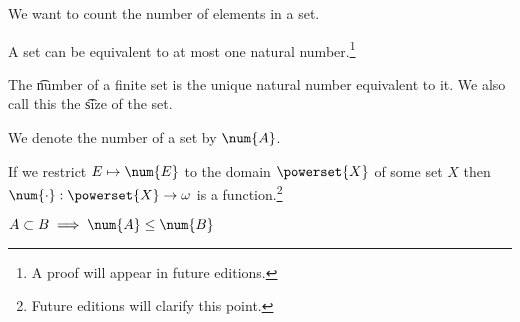 

We want to count the number of elements in a set.


\begin{proposition}
  A set can be equivalent to at most one natural number.\footnote{A proof will appear in future editions.}
\end{proposition}

The \t{number} of a finite set is the unique natural number equivalent to it.
We also call this the \t{size} of the set.



We denote the number of a set by $\num{A}$.


If we restrict $E \mapsto \num{E}$ to the domain $\powerset{X}$ of some set $X$ then $\num{\cdot}: \powerset{X} \to \omega$ is a function.\footnote{Future editions will clarify this point.}


\begin{proposition}
	$A \subset B \implies \num{A} \leq \num{B}$
\end{proposition}





\blankpage
